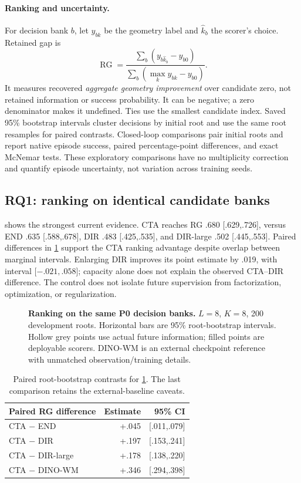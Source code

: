 \paragraph{Ranking and uncertainty.}
For decision bank $b$, let $y_{bk}$ be the geometry label and $\hat k_b$ the scorer's choice. Retained gap is
\begin{equation}
\operatorname{RG}=\frac{\sum_b(y_{b\hat k_b}-y_{b0})}
{\sum_b(\max_k y_{bk}-y_{b0})}.
\label{eq:rg}
\end{equation}
It measures recovered \emph{aggregate geometry improvement} over candidate zero, not retained information or success probability. It can be negative; a zero denominator makes it undefined. Ties use the smallest candidate index. Saved 95\% bootstrap intervals cluster decisions by initial root and use the same root resamples for paired contrasts. Closed-loop comparisons pair initial roots and report native episode success, paired percentage-point differences, and exact McNemar tests. These exploratory comparisons have no multiplicity correction and quantify episode uncertainty, not variation across training seeds.

\subsection{RQ1: ranking on identical candidate banks}
\label{sec:ranking}
 shows the strongest current evidence. CTA reaches RG .680 [.629,.726], versus END .635 [.588,.678], DIR .483 [.425,.535], and DIR-large .502 [.445,.553]. Paired differences in \cref{tab:pairedrank} support the CTA ranking advantage despite overlap between marginal intervals. Enlarging DIR improves its point estimate by .019, with interval [$-.021,.058$]; capacity alone does not explain the observed CTA--DIR difference. The control does not isolate future supervision from factorization, optimization, or regularization.

\begin{figure}[t]
\centering
\caption{\textbf{Ranking on the same P0 decision banks.} $L=8$, $K=8$, 200 development roots. Horizontal bars are 95\% root-bootstrap intervals. Hollow grey points use actual future information; filled points are deployable scorers. DINO-WM is an external checkpoint reference with unmatched observation/training details.}
\label{fig:ranking}
\end{figure}
\begin{table}[t]
\centering\small
\begin{tabular}{lrr}
\toprule
Paired RG difference & Estimate & 95\% CI \\
\midrule
CTA $-$ END & +.045 & [.011,.079] \\
CTA $-$ DIR & +.197 & [.153,.241] \\
CTA $-$ DIR-large & +.178 & [.138,.220] \\
CTA $-$ DINO-WM & +.346 & [.294,.398] \\
\bottomrule
\end{tabular}
\caption{Paired root-bootstrap contrasts for \cref{fig:ranking}. The last comparison retains the external-baseline caveats.}
\label{tab:pairedrank}
\end{table}

